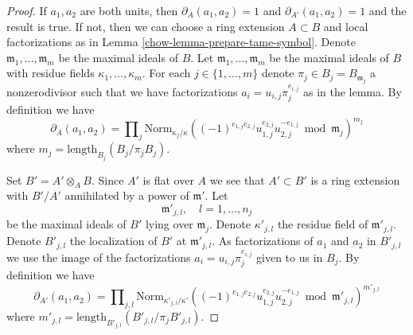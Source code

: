 \begin{proof}

If $a_1, a_2$ are both units, then $\partial_A(a_1, a_2) = 1$
and $\partial_{A'}(a_1, a_2) = 1$ and the result is true.
If not, then we can choose a ring extension $A \subset B$ and
local factorizations as in Lemma \ref{chow-lemma-prepare-tame-symbol}.
Denote $\mathfrak m_1, \ldots, \mathfrak m_m$
be the maximal ideals of $B$. Let $\mathfrak m_1, \ldots, \mathfrak m_m$
be the maximal ideals of $B$ with residue fields $\kappa_1, \ldots, \kappa_m$.
For each $j \in \{1, \ldots, m\}$ denote $\pi_j \in B_j = B_{\mathfrak m_j}$
a nonzerodivisor such that we have factorizations
$a_i = u_{i, j}\pi_j^{e_{i, j}}$ as in the lemma.
By definition we have
$$
\partial_A(a_1, a_2) = \prod\nolimits_j
\text{Norm}_{\kappa_j/\kappa}
((-1)^{e_{1, j}e_{2, j}}u_{1, j}^{e_{2, j}}u_{2, j}^{-e_{1, j}}
\bmod \mathfrak m_j)^{m_j}
$$
where $m_j = \text{length}_{B_j}(B_j/\pi_j B_j)$.

\medskip\noindent
Set $B' = A' \otimes_A B$. Since $A'$ is flat over $A$ we see
that $A' \subset B'$ is a ring extension with $B'/A'$ annihilated
by a power of $\mathfrak m'$. Let
$$
\mathfrak m'_{j, l},\quad l = 1, \ldots, n_j
$$
be the maximal ideals of $B'$ lying over $\mathfrak m_j$. Denote
$\kappa'_{j, l}$ the residue field of $\mathfrak m'_{j, l}$. Denote
$B'_{j, l}$ the localization of $B'$ at $\mathfrak m'_{j, l}$.
As factorizations of $a_1$ and $a_2$ in $B'_{j, l}$
we use the image of the factorizations
$a_i = u_{i, j} \pi_j^{e_{i, j}}$ given to us in $B_j$.
By definition we have
$$
\partial_{A'}(a_1, a_2) = \prod\nolimits_{j, l}
\text{Norm}_{\kappa'_{j, l}/\kappa'}
((-1)^{e_{1, j}e_{2, j}}u_{1, j}^{e_{2, j}}u_{2, j}^{-e_{1, j}}
\bmod \mathfrak m'_{j, l})^{m'_{j, l}}
$$
where $m'_{j, l} = \text{length}_{B'_{j, l}}(B'_{j, l}/\pi_j B'_{j, l})$.


\end{proof}
